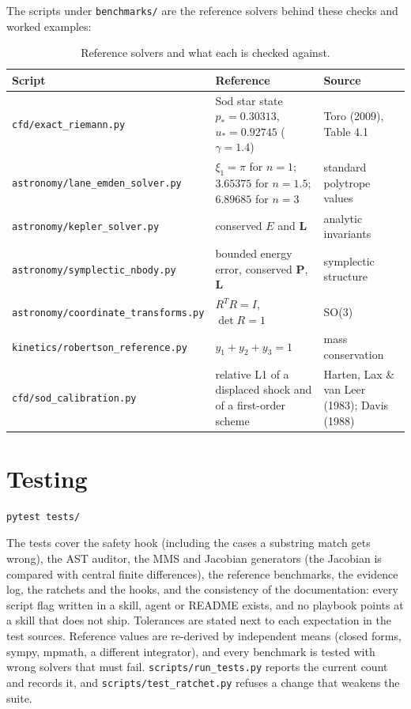 \documentclass[11pt,a4paper]{report}
\begin{document}
The scripts under \texttt{benchmarks/} are the reference solvers behind these checks and worked examples:
\begin{table}[h]
\centering
\small
\begin{tabular}{p{4.6cm}p{6cm}p{3.6cm}}
\toprule
\textbf{Script} & \textbf{Reference} & \textbf{Source} \\
\midrule
\texttt{cfd/exact\_riemann.py} & Sod star state $p_*=0.30313$, $u_*=0.92745$ ($\gamma=1.4$) & Toro (2009), Table 4.1 \\
\texttt{astronomy/lane\_emden\_solver.py} & $\xi_1=\pi$ for $n=1$; $3.65375$ for $n=1.5$; $6.89685$ for $n=3$ & standard polytrope values \\
\texttt{astronomy/kepler\_solver.py} & conserved $E$ and $\mathbf L$ & analytic invariants \\
\texttt{astronomy/symplectic\_nbody.py} & bounded energy error, conserved $\mathbf P$, $\mathbf L$ & symplectic structure \\
\texttt{astronomy/coordinate\_transforms.py} & $R^TR=I$, $\det R=1$ & SO(3) \\
\texttt{kinetics/robertson\_reference.py} & $y_1+y_2+y_3=1$ & mass conservation \\
\texttt{cfd/sod\_calibration.py} & relative L1 of a displaced shock and of a first-order scheme & Harten, Lax \& van Leer (1983); Davis (1988) \\
\bottomrule
\end{tabular}
\caption{Reference solvers and what each is checked against.}
\end{table}

\chapter{Testing}
\begin{lstlisting}[language=bash]
pytest tests/
\end{lstlisting}
The tests cover the safety hook (including the cases a substring match gets wrong), the AST auditor, the MMS and Jacobian generators (the Jacobian is compared with central finite differences), the reference benchmarks, the evidence log, the ratchets and the hooks, and the consistency of the documentation: every script flag written in a skill, agent or README exists, and no playbook points at a skill that does not ship. Tolerances are stated next to each expectation in the test sources. Reference values are re-derived by independent means (closed forms, sympy, mpmath, a different integrator), and every benchmark is tested with wrong solvers that must fail. \texttt{scripts/run\_tests.py} reports the current count and records it, and \texttt{scripts/test\_ratchet.py} refuses a change that weakens the suite.
\end{document}
